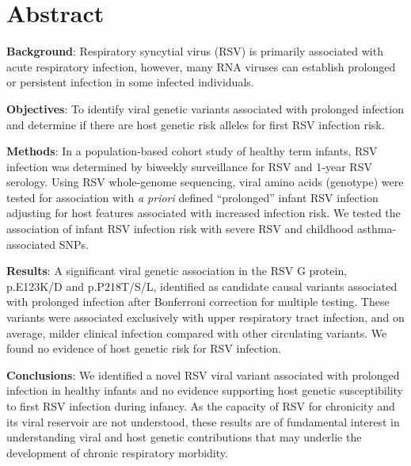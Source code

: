 \documentclass{article} %
\begin{document}
\clearpage
\section{Abstract}
\textbf{Background}: Respiratory syncytial virus (RSV) is primarily associated with acute respiratory infection, however, many RNA viruses can establish prolonged or persistent infection in some infected individuals.

\textbf{Objectives}: To identify viral genetic variants associated with prolonged infection and determine if there are host genetic risk alleles for first RSV infection risk.

\textbf{Methods}: In a population-based cohort study of healthy term infants, RSV infection was determined by biweekly surveillance for RSV and 1-year RSV serology. Using RSV whole-genome sequencing, viral amino acids (genotype) were tested for association with \textit{a priori} defined ``prolonged'' infant RSV infection adjusting for host features associated with increased infection risk. We tested the association of infant RSV infection risk with severe RSV and childhood asthma-associated SNPs.

\textbf{Results}: A significant viral genetic association in the RSV G protein, p.E123K/D and p.P218T/S/L, identified as candidate causal variants associated with prolonged infection after Bonferroni correction for multiple testing. These variants were associated exclusively with upper respiratory tract infection, and on average, milder clinical infection compared with other circulating variants. We found no evidence of host genetic risk for RSV infection.

\textbf{Conclusions}: We identified a novel RSV viral variant associated with prolonged infection in healthy infants and no evidence supporting host genetic susceptibility to first RSV infection during infancy. As the capacity of RSV for chronicity and its viral reservoir are not understood, these results are of fundamental interest in understanding viral and host genetic contributions that may underlie the development of chronic respiratory morbidity.
\end{document}
